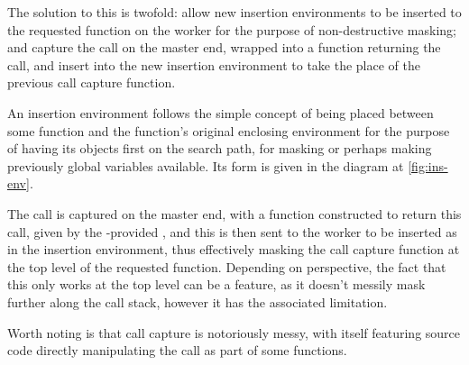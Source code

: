 The solution to this is twofold: allow new insertion environments to be inserted to the requested function on the worker for the purpose of non-destructive masking; and capture the call on the master end, wrapped into a function returning the call, and insert into the new insertion environment to take the place of the previous call capture function.

An insertion environment follows the simple concept of being placed between some function and the function's original enclosing environment for the purpose of having its objects first on the search path, for masking or perhaps making previously global variables available.
Its form is given in the diagram at \cref{fig:ins-env}.



The call is captured on the master end, with a function constructed to return this call, given by the \lso{}-provided , and this is then sent to the worker to be inserted as  in the insertion environment, thus effectively masking the call capture function at the top level of the requested  function.
Depending on perspective, the fact that this only works at the top level can be a feature, as it doesn't messily mask further along the call stack, however it has the associated limitation.

Worth noting is that call capture is notoriously messy, with  itself featuring source code directly manipulating the call as part of some functions.

